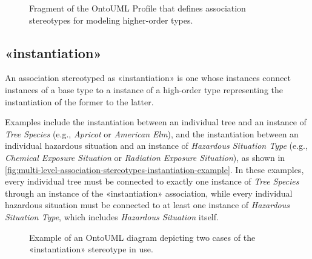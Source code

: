 \begin{figure}[h]
    \centering
    
    \caption{Fragment of the OntoUML Profile that defines association stereotypes for modeling higher-order types.}
    \label{fig:multi-level-association-stereotypes}
\end{figure}

\subsection{«instantiation»}
\label{stereotype:instantiation}

An association stereotyped as «instantiation» is one whose instances connect instances of a base type to a instance of a high-order type representing the instantiation of the former to the latter.


Examples include the instantiation between an individual tree and an instance of \textit{Tree Species} (e.g., \textit{Apricot} or \textit{American Elm}), and the instantiation between an individual hazardous situation and an instance of \textit{Hazardous Situation Type}  (e.g., \textit{Chemical Exposure Situation} or \textit{Radiation Exposure Situation}), as shown in \autoref{fig:multi-level-association-stereotypes-instantiation-example}. In these examples, every individual tree must be connected to exactly one instance of \textit{Tree Species} through an instance of the «instantiation» association, while every individual hazardous situation must be connected to at least one instance of \textit{Hazardous Situation Type}, which includes \textit{Hazardous Situation} itself.

\begin{figure}[h]
    \centering
    
    \caption{Example of an OntoUML diagram depicting two cases of the «instantiation» stereotype in use.}
    \label{fig:multi-level-association-stereotypes-instantiation-example}
\end{figure}

